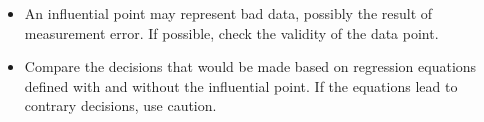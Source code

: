 \documentclass[residuals.tex]{subfiles}
\begin{document}
\begin{itemize}
\item An influential point may represent bad data, possibly the result of measurement error. If possible, check the validity of the data point.

\item Compare the decisions that would be made based on regression equations defined with and without the influential point. If the equations lead to contrary decisions, use caution.

\end{itemize}
%
%
%
%
%
\end{document}
